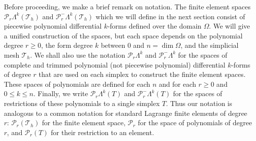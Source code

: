 {Before proceeding, we make a brief remark on notation. The finite element spaces $\mathcal P_r\Lambda^k(\mathcal T_h)$ and $\mathcal P_r^-\Lambda^k(\mathcal T_h)$ which we will define in the next section consist of piecewise polynomial differential $k$-forms defined over the domain $\Omega$. We will give a unified construction of the spaces, but each space depends on the polynomial degree $r\geq0$, the form degree $k$ between $0$ and $n=\dim\Omega$, and the simplicial mesh $\mathcal T_h$. We shall also use the notation $\mathcal P_r\Lambda^k$ and $\mathcal P_r^-\Lambda^k$ for the spaces of complete and trimmed polynomial (not piecewise polynomial) differential $k$-forms of degree $r$ that are used on each simplex to construct the finite element spaces. These spaces of polynomials are defined for each $n$ and for each $r\geq0$ and $0\leq k\leq n$. Finally, we write $\mathcal P_r\Lambda^k(T)$ and $\mathcal P_r^-\Lambda^k(T)$ for the spaces of restrictions of these polynomials to a single simplex $T$. Thus our notation is analogous to a common notation for standard Lagrange finite elements of degree $r$: $\mathcal P_r(\mathcal T_h)$ for the finite element space, $\mathcal P_r$ for the space of polynomials of degree $r$, and $\mathcal P_r(T)$ for their restriction to an element.}
